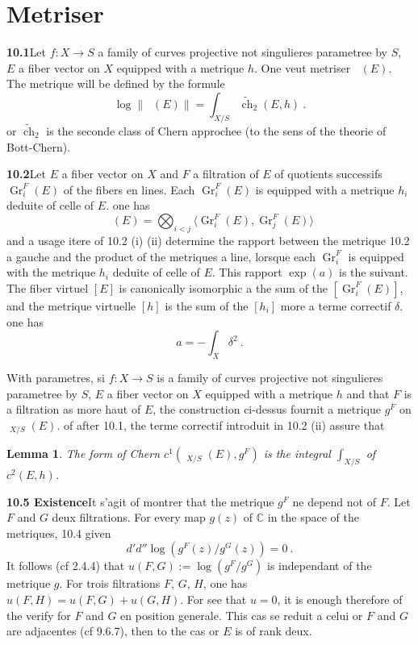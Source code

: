 \documentclass[12pt,a4paper]{article}
\theoremstyle{plain}
\newtheorem{lemma}[theorem]{Lemma}
\theoremstyle{definition}
\theoremstyle{remark}
\DeclareMathOperator{\ch}{ch}
\DeclareMathOperator{\Gr}{Gr}
\newcommand{\bbC}{\mathbb{C}}
\DeclareMathOperator{\ICtwo}{IC_2}
\begin{document}
\section{Metriser $\ICtwo$}

\noindent\textbf{10.1}\quad Let $f: X \to S$ a family of curves projective not singulieres parametree by $S$, $E$ a fiber vector on $X$ equipped with a metrique $h$. One veut metriser $\ICtwo(E)$. The metrique will be defined by the formule
\begin{equation}
\label{eq:10.1.1}
\log \|\ICtwo(E)\| = \int_{X/S} \widetilde{\ch}_2(E, h) \ .
\end{equation}
or $\widetilde{\ch}_2$ is the seconde class of Chern approchee (to the sens of the theorie of Bott-Chern).

\medskip
\noindent\textbf{10.2}\quad Let $E$ a fiber vector on $X$ and $F$ a filtration of $E$ of quotients successifs $\Gr_i^F(E)$ of the fibers en lines. Each $\Gr_i^F(E)$ is equipped with a metrique $h_i$ deduite of celle of $E$. one has
\begin{equation}
\label{eq:10.2.1}
\ICtwo(E) = \bigotimes_{i < j} \langle \Gr_i^F(E), \Gr_j^F(E) \rangle
\end{equation}
and a usage itere of 10.2 (i) (ii) determine the rapport between the metrique 10.2 a gauche and the product of the metriques a line, lorsque each $\Gr_i^F$ is equipped with the metrique $h_i$ deduite of celle of $E$. This rapport $\exp(a)$ is the suivant. The fiber virtuel $[E]$ is canonically isomorphic a the sum of the $[\Gr_i^F(E)]$, and the metrique virtuelle $[h]$ is the sum of the $[h_i]$ more a terme correctif $\delta$. one has
\begin{equation}
\label{eq:10.2.2}
a = -\int_X \delta^2 \ .
\end{equation}

With parametres, si $f: X \to S$ is a family of curves projective not singulieres parametree by $S$, $E$ a fiber vector on $X$ equipped with a metrique $h$ and that $F$ is a filtration as more haut of $E$, the construction ci-dessus fournit a metrique $g^F$ on $\ICtwo_{X/S}(E)$. of after 10.1, the terme correctif introduit in 10.2 (ii) assure that

\begin{lemma}
The form of Chern $c^1(\ICtwo_{X/S}(E), g^F)$ is the integral $\int_{X/S}$ of $c^2(E, h)$.
\end{lemma}

\medskip
\noindent\textbf{10.5 Existence}\quad It s'agit of montrer that the metrique $g^F$ ne depend not of $F$. Let $F$ and $G$ deux filtrations. For every map $g(z)$ of $\bbC$ in the space of the metriques, 10.4 given
\[
d'd'' \log(g^F(z)/g^G(z)) = 0 \ .
\]
It follows (cf 2.4.4) that $u(F, G) := \log(g^F/g^G)$ is independant of the metrique $g$. For trois filtrations $F$, $G$, $H$, one has $u(F, H) = u(F, G) + u(G, H)$. For see that $u = 0$, it is enough therefore of the verify for $F$ and $G$ en position generale. This cas se reduit a celui or $F$ and $G$ are adjacentes (cf 9.6.7), then to the cas or $E$ is of rank deux.
\end{document}
